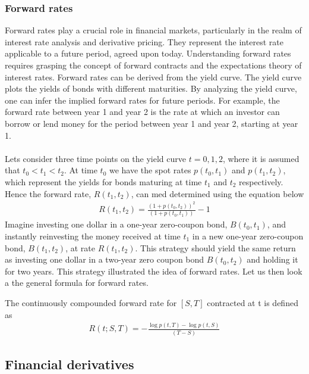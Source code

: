 \subsubsection{Forward rates}
Forward rates play a crucial role in financial markets, particularly in the realm of interest rate analysis and 
derivative pricing. They represent the interest rate applicable to a future period, agreed upon today.
Understanding forward rates requires grasping the concept of forward contracts and the expectations theory of interest rates.
Forward rates can be derived from the yield curve. The yield curve plots the yields of bonds with different maturities.
By analyzing the yield curve, one can infer the implied forward rates for future periods. For example, 
the forward rate between year 1 and year 2 is the rate at which an investor can borrow or lend money for the period
between year 1 and year 2, starting at year 1.
\\\\
Lets consider three time points on the yield curve $t=0,1,2$, where it is assumed
that $t_0 < t_1 < t_2$. At time $t_0$ we have the spot rates $p(t_0,t_1)$ and $p(t_1,t_2)$,
which represent the yields for bonds maturing at time $t_1$ and $t_2$ respectively.
Hence the forward rate, $R(t_1,t_2)$, can med determined using the equation below
\begin{align*}
    R(t_1,t_2)= \frac{(1+p(t_0,t_2))^2}{(1+p(t_0,t_1))}-1
\end{align*}
Imagine investing one dollar in a one-year zero-coupon bond, $B(t_0,t_1)$,
and instantly reinvesting the money received at time $t_1$ in a new one-year zero-coupon bond,
$B(t_1,t_2)$, at rate $R(t_1,t_2)$. This strategy should yield the same return as investing 
one dollar in a two-year zero coupon bond $B(t_0,t_2)$ and holding it for two years. 
This strategy illustrated the idea of forward rates. Let us then look a the general
formula for forward rates. 
\begin{definition}\label{def:forward}
    The continuously compounded forward rate for $[S,T]$ contracted at t is defined
    as \cite{Bjork} 
    \begin{align*}
        R(t;S,T)= - \frac{\log p(t,T)- \log p(t,S)}{(T-S)} 
    \end{align*}
\end{definition} 
\subsection{Financial derivatives}
